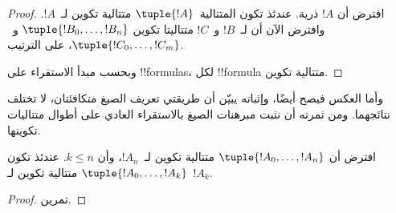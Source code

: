 \documentclass[../../../include/open-logic-section]{subfiles}
\begin{document}
\begin{proof}
افترض أن $!A$ ذرية. عندئذ تكون المتتالية~$\tuple{!A}$ متتالية
تكوين لـ~$!A$.
%
وافترض الآن أن لـ~$!B$ و~$!C$ متتاليتا تكوين
$\tuple{!B_0,\dotsc,!B_n}$ و~$\tuple{!C_0,\dotsc,!C_m}$،
على الترتيب.
%
\begin{enumerate}
\end{enumerate}
وبحسب مبدأ الاستقراء على !!{formula}s، لكل
!!{formula} متتالية تكوين.
\end{proof}

وأما العكس فيصح أيضًا، وإثباته يبيّن أن طريقتي تعريف الصيغ متكافئتان، لا تختلف نتائجهما. ومن ثمرته أن نثبت مبرهنات الصيغ بالاستقراء العادي على أطوال متتاليات تكوينها.

\begin{lem}
افترض أن $\tuple{!A_0,\dotsc,!A_n}$ متتالية تكوين لـ~$!A_n$، وأن
$k \leq n$. عندئذ تكون $\tuple{!A_0,\dotsc,!A_k}$ متتالية تكوين
لـ~$!A_k$.
\end{lem}

\begin{proof}
تمرين.
\end{proof}
\end{document}
